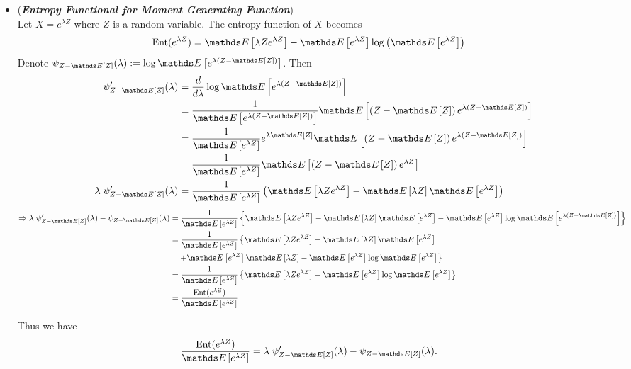 \documentclass[11pt]{article}
\begin{document}
\begin{itemize}
\item \begin{remark} (\emph{\textbf{Entropy Functional for Moment Generating Function}})\\
Let $X = e^{\lambda Z}$ where $Z$ is a random variable. The entropy function of $X$ becomes
\begin{align*}
\text{Ent}(e^{\lambda Z}) &= \E{}{\lambda Z e^{\lambda Z}} - \E{}{e^{\lambda Z}}\log\paren{\E{}{e^{\lambda Z}}}
\end{align*} Denote $\psi_{Z - \E{}{Z}}(\lambda) := \log\E{}{e^{\lambda (Z - \E{}{Z})}}$. Then
\begin{align*}
\psi_{Z - \E{}{Z}}'(\lambda) &= \frac{d}{d\lambda}\log\E{}{e^{\lambda (Z - \E{}{Z})}}\\
&= \frac{1}{\E{}{e^{\lambda (Z - \E{}{Z})}}}\E{}{\paren{Z - \E{}{Z}} e^{\lambda (Z - \E{}{Z})}}\\
&= \frac{1}{\E{}{e^{\lambda Z}}}e^{\lambda \E{}{Z}}\E{}{\paren{Z - \E{}{Z}} e^{\lambda (Z - \E{}{Z})}}\\
&= \frac{1}{\E{}{e^{\lambda Z}}}\E{}{\paren{Z - \E{}{Z}} e^{\lambda Z}}\\
\lambda\; \psi_{Z - \E{}{Z}}'(\lambda) &= \frac{1}{\E{}{e^{\lambda Z}}}\paren{\E{}{\lambda Z e^{\lambda Z}} - \E{}{\lambda Z} \E{}{e^{\lambda Z}}} 
\end{align*} 
\begin{align*}
\Rightarrow \lambda\; \psi_{Z - \E{}{Z}}'(\lambda) - \psi_{Z - \E{}{Z}}(\lambda) &= \frac{1}{\E{}{e^{\lambda Z}}}\set{\E{}{\lambda Z e^{\lambda Z}} - \E{}{\lambda Z} \E{}{e^{\lambda Z}} - \E{}{e^{\lambda Z}} \log\E{}{e^{\lambda (Z - \E{}{Z})}}}\\
&=  \frac{1}{\E{}{e^{\lambda Z}}}\left\{\E{}{\lambda Z e^{\lambda Z}} - \E{}{\lambda Z} \E{}{e^{\lambda Z}} \right. \\
&\quad \left. + \E{}{e^{\lambda Z}}\E{}{\lambda Z} - \E{}{e^{\lambda Z}} \log\E{}{e^{\lambda Z}}\right\} \\
&= \frac{1}{\E{}{e^{\lambda Z}}}\set{\E{}{\lambda Z e^{\lambda Z}} - \E{}{e^{\lambda Z}} \log\E{}{e^{\lambda Z}}}\\
&= \frac{\text{Ent}(e^{\lambda Z})}{\E{}{e^{\lambda Z}}}
\end{align*}

Thus we have
\begin{align}
\frac{\text{Ent}(e^{\lambda Z})}{\E{}{e^{\lambda Z}}} &= \lambda\; \psi_{Z - \E{}{Z}}'(\lambda) - \psi_{Z - \E{}{Z}}(\lambda). \label{eqn: entropy_log_mgf_differential}
\end{align} 


\end{remark}
\end{itemize}
\end{document}
